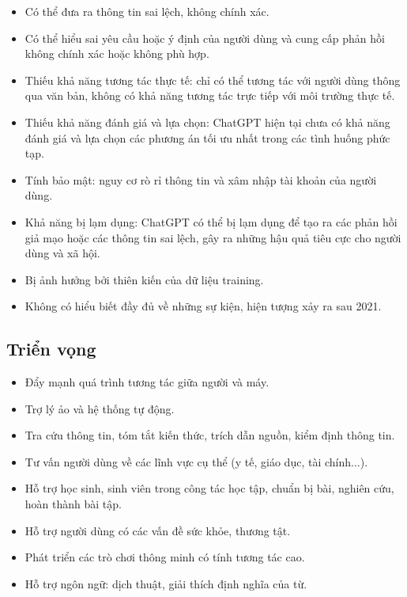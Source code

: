 \documentclass[a4paper, 12pt]{article}
\begin{document}
		\begin{itemize}
			\item Có thể đưa ra thông tin sai lệch, không chính xác.
			\item Có thể hiểu sai yêu cầu hoặc ý định của người dùng và cung cấp phản hồi không chính xác hoặc không phù hợp.
			\item Thiếu khả năng tương tác thực tế: chỉ có thể tương tác với người dùng thông qua văn bản, không có khả năng tương tác trực tiếp với môi trường thực tế.
			\item Thiếu khả năng đánh giá và lựa chọn: ChatGPT hiện tại chưa có khả năng đánh giá và lựa chọn các phương án tối ưu nhất trong các tình huống phức tạp.
			\item Tính bảo mật: nguy cơ rò rỉ thông tin và xâm nhập tài khoản của người dùng.
			\item Khả năng bị lạm dụng: ChatGPT có thể bị lạm dụng để tạo ra các phản hồi giả mạo hoặc các thông tin sai lệch, gây ra những hậu quả tiêu cực cho người dùng và xã hội.
			\item Bị ảnh hưởng bởi thiên kiến của dữ liệu training.
			\item Không có hiểu biết đầy đủ về những sự kiện, hiện tượng xảy ra sau 2021.
		\end{itemize}
	
		
		\subsection{Triển vọng}
		\begin{itemize}
			\item Đẩy mạnh quá trình tương tác giữa người và máy.
			\item Trợ lý ảo và hệ thống tự động.
			\item Tra cứu thông tin, tóm tắt kiến thức, trích dẫn nguồn, kiểm định thông tin.
			\item Tư vấn người dùng về các lĩnh vực cụ thể (y tế, giáo dục, tài chính...).
			\item Hỗ trợ học sinh, sinh viên trong công tác học tập, chuẩn bị bài, nghiên cứu, hoàn thành bài tập.
			\item Hỗ trợ người dùng có các vấn đề sức khỏe, thương tật.
			\item Phát triển các trò chơi thông minh có tính tương tác cao.
			\item Hỗ trợ ngôn ngữ: dịch thuật, giải thích định nghĩa của từ.
		\end{itemize}
	
\end{document}
